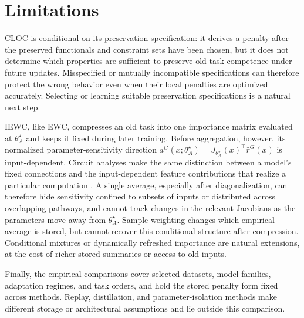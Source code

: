 \section{Limitations}

CLOC is conditional on its preservation specification: it derives a penalty after the preserved functionals and constraint sets have been chosen, but it does not determine which properties are sufficient to preserve old-task competence under future updates. Misspecified or mutually incompatible specifications can therefore protect the wrong behavior even when their local penalties are optimized accurately. Selecting or learning suitable preservation specifications is a natural next step.

IEWC, like EWC, compresses an old task into one importance matrix evaluated at $\theta_A^\star$ and keeps it fixed during later training. Before aggregation, however, its normalized parameter-sensitivity direction $a^{G}(x;\theta_A^\star)=J_{\theta_A^\star}(x)^\top\hat r^{G}(x)$ is input-dependent. Circuit analyses make the same distinction between a model's fixed connections and the input-dependent feature contributions that realize a particular computation \citep{DunefskyTranscoders}. A single average, especially after diagonalization, can therefore hide sensitivity confined to subsets of inputs or distributed across overlapping pathways, and cannot track changes in the relevant Jacobians as the parameters move away from $\theta_A^\star$. Sample weighting changes which empirical average is stored, but cannot recover this conditional structure after compression. Conditional mixtures or dynamically refreshed importance are natural extensions, at the cost of richer stored summaries or access to old inputs.

Finally, the empirical comparisons cover selected datasets, model families, adaptation regimes, and task orders, and hold the stored penalty form fixed across methods. Replay, distillation, and parameter-isolation methods make different storage or architectural assumptions and lie outside this comparison.
